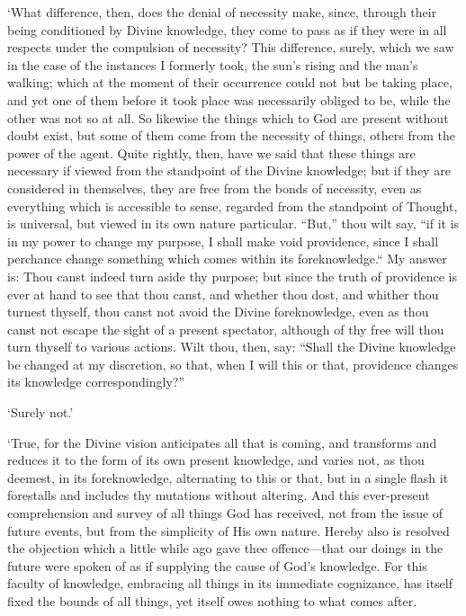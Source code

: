 \documentclass[11pt]{book}
\begin{document}
`What difference, then, does the denial of necessity make, since,
through their being conditioned by Divine knowledge, they come to pass
as if they were in all respects under the compulsion of necessity? This
difference, surely, which we saw in the case of the instances I formerly
took, the sun's rising and the man's walking; which at the moment of
their occurrence could not but be taking place, and yet one of them
before it took place was necessarily obliged to be, while the other was
not so at all. So likewise the things which to God are present without
doubt exist, but some of them come from the necessity of things, others
from the power of the agent. Quite rightly, then, have we said that
these things are necessary if viewed from the standpoint of the Divine
knowledge; but if they are considered in themselves, \linebreak they are free from
the bonds of necessity, even as everything which is accessible to sense,
regarded from the standpoint of Thought, is universal, but viewed in its
own nature particular. ``But,'' thou wilt say, ``if it is in my power to
change my purpose, I shall make void providence, since I shall perchance
change something which comes within its foreknowledge.`` My answer is:
Thou canst indeed turn aside thy purpose; but since the truth of
providence is ever at hand to see that thou canst, and whether thou
dost, and whither thou turnest thyself, thou canst not avoid the Divine
foreknowledge, even as thou canst not escape the sight of a present
spectator, although of thy free will thou turn thyself to various
actions. Wilt thou, then, say: ``Shall the Divine knowledge be changed at
my discretion, so that, when I will this or that, providence changes its
knowledge correspondingly?''

`Surely not.'

`True, for the Divine vision anticipates all that is coming, and
transforms and reduces it to the form of its own present knowledge, and
varies not, as thou deemest, in its foreknowledge, alternating to this
or that, but in a single flash it forestalls and includes thy mutations
without altering. And this ever-present comprehension and survey of all
things God has received, not from the issue of future events, but from
the simplicity of His own nature. Hereby also is resolved the objection
which a little while ago gave thee offence---that our doings in the
future were spoken of as if supplying the cause of God's knowledge. For
this faculty of knowledge, embracing all things in its immediate
cognizance, has itself fixed the bounds of all things, yet itself owes
nothing to what comes after.
\end{document}
